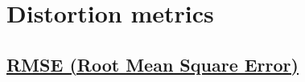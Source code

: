 \documentclass{article}
\begin{document}





\section{Distortion metrics}

\subsection{\href{https://en.wikipedia.org/wiki/Root_mean_square_deviation}{RMSE (Root Mean
    Square Error)}}
\end{document}
